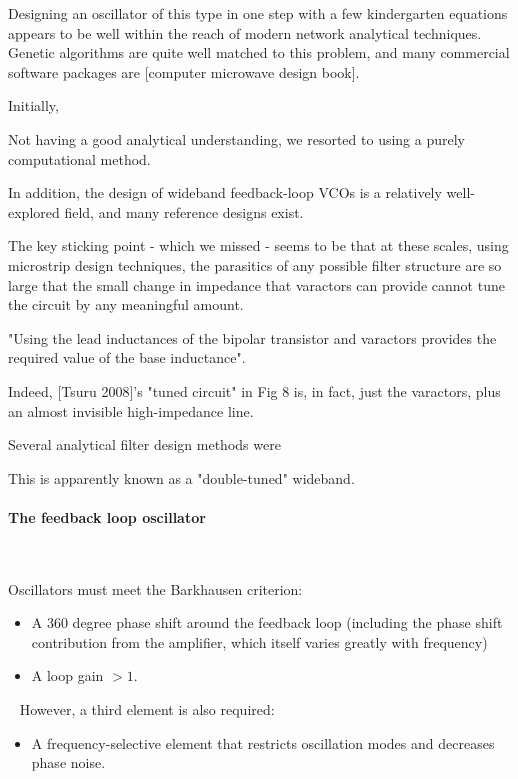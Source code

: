 \documentclass[fleqn,10pt]{article}
\begin{document}
\begin{multicols}{1}
Designing an oscillator of this type in one step with a few kindergarten equations appears to be well within the reach of modern network analytical techniques. Genetic algorithms are quite well matched to this problem, and many commercial software packages are  [computer microwave design book]. 

Initially, 

Not having a good analytical understanding, we resorted to using a purely computational method.

In addition, the design of wideband feedback-loop VCOs is a relatively well-explored field, and many reference designs exist. 

The key sticking point - which we missed - seems to be that at these scales, using microstrip design techniques, the parasitics of any possible filter structure are so large that the small change in impedance that varactors can provide cannot tune the circuit by any meaningful amount.

"Using the lead inductances of the bipolar transistor and varactors provides the required value of the base inductance".

Indeed, [Tsuru 2008]'s "tuned circuit" in Fig 8 is, in fact, just the varactors, plus an almost invisible high-impedance line.





Several analytical filter design methods were 

This is apparently known as a "double-tuned" wideband.

%
\paragraph{\textbf{The feedback loop oscillator}}\

Oscillators must meet the Barkhausen criterion:

\begin{itemize}

\item A 360 degree phase shift around the feedback loop (including the phase shift contribution from the amplifier, which itself varies greatly with frequency)
\item A loop gain $>1.$ 

\end{itemize}\
%
However, a third element is also required:
%
\begin{itemize}
\item A frequency-selective element that restricts oscillation modes and decreases phase noise.
\end{itemize}
%


\end{multicols}
\end{document}
